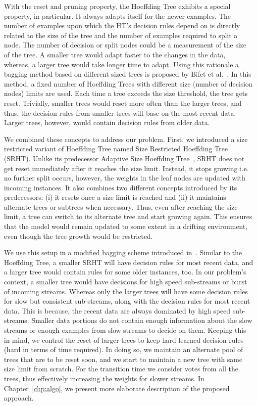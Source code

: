 With the reset and pruning property, the Hoeffding Tree exhibits a special property, in particular. It always adapts itself for the newer examples. The number of examples upon which the HT's decision rules depend on is directly related to the size of the tree and the number of examples required to split a node. The number of decision or split nodes could be a measurement of the size of the tree. A smaller tree would adapt faster to the changes in the data, whereas, a larger tree would take longer time to adapt. Using this rationale a bagging method based on different sized trees is proposed by Bifet et al.~\cite{bifet09:asht}. In this method, a fixed number of Hoeffding Trees with different size (number of decision nodes) limits are used. Each time a tree exceeds the size threshold, the tree gets reset. Trivially, smaller trees would reset more often than the larger trees, and thus, the decision rules from smaller trees will base on the most recent data. Larger trees, however, would contain decision rules from older data.

We combined these concepts to address our problem. First, we introduced a size restricted variant of Hoeffding Tree named Size Restricted Hoeffding Tree (SRHT). Unlike its predecessor Adaptive Size Hoeffding Tree~\cite{bifet09:asht}, SRHT does not get reset immediately after it reaches the size limit. Instead, it stops growing i.e. no further split occurs, however, the weights in the leaf nodes are updated with incoming instances. It also combines two different concepts introduced by its predecessors: (i) it resets once a size limit is reached and (ii) it maintains alternate trees or subtrees when necessary. Thus, even after reaching the size limit, a tree can switch to its alternate tree and start growing again. This ensures that the model would remain updated to some extent in a drifting environment, even though the tree growth would be restricted.

We use this setup in a modified bagging scheme introduced in~\cite{bifet09:asht}. Similar to the Hoeffding Tree, a smaller SRHT will have decision rules for most recent data, and a larger tree would contain rules for some older instances, too. In our problem's context, a smaller tree would have decisions for high speed sub-streams or burst of incoming streams. Whereas only the larger trees will have some decision rules for slow but consistent sub-streams, along with the decision rules for most recent data. This is because, the recent data are always dominated by high speed sub-streams. Smaller data portions do not contain enough information about the slow streams or enough examples from slow streams to decide on them. Keeping this in mind, we control the reset of larger trees to keep hard-learned decision rules (hard in terms of time required). In doing so, we maintain an alternate pool of trees that are to be reset soon, and we start to maintain a new tree with same size limit from scratch. For the transition time we consider votes from all the trees, thus effectively increasing the weights for slower streams. In Chapter~\ref{chp:algo}, we present more elaborate description of the proposed approach.

